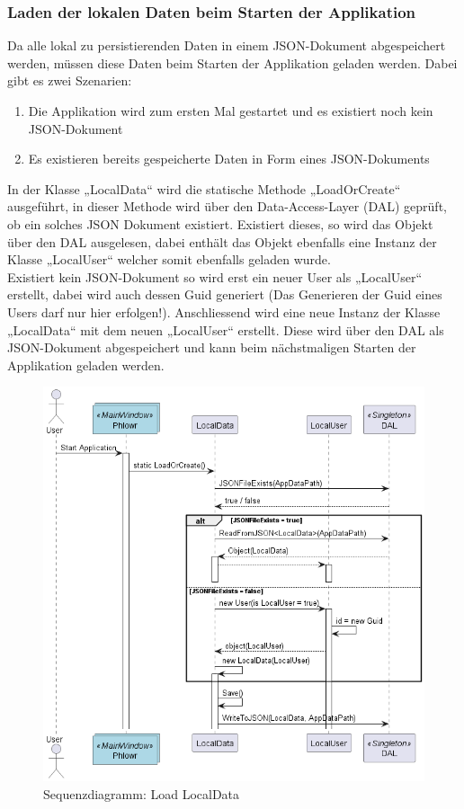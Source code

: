 \subsubsection{Laden der lokalen Daten beim Starten der Applikation}
Da alle lokal zu persistierenden Daten in einem JSON-Dokument abgespeichert werden,
müssen diese Daten beim Starten der Applikation geladen werden. Dabei gibt es zwei Szenarien:\\
\begin{enumerate}
  \item Die Applikation wird zum ersten Mal gestartet und es existiert noch kein JSON-Dokument\\
  \item Es existieren bereits gespeicherte Daten in Form eines JSON-Dokuments\\
\end{enumerate}

In der Klasse „LocalData“ wird die statische Methode „LoadOrCreate“ ausgeführt, in dieser Methode wird über
den Data-Access-Layer (DAL) geprüft, ob ein solches JSON Dokument existiert. Existiert dieses, so wird
das Objekt über den DAL ausgelesen, dabei enthält das Objekt ebenfalls eine Instanz der Klasse „LocalUser“
welcher somit ebenfalls geladen wurde.\\
Existiert kein JSON-Dokument so wird erst ein neuer User als „LocalUser“ erstellt, dabei wird auch dessen Guid generiert
(Das Generieren der Guid eines Users darf nur hier erfolgen!). Anschliessend wird eine neue Instanz der Klasse „LocalData“ mit dem neuen „LocalUser“ erstellt.
Diese wird über den DAL als JSON-Dokument abgespeichert und kann beim nächstmaligen Starten der Applikation geladen werden.

\begin{figure}[H]
  \begin{center}
    \includegraphics[width=0.7\linewidth]{../content/diagrams/sequence/loadLocalDataSequence/loadLocalDataSequence.png}
    \caption{Sequenzdiagramm: Load LocalData}
  \end{center}
\end{figure}
\newpage

